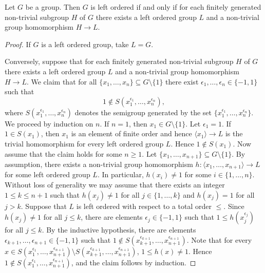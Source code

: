 
\begin{theorem}
\label{thm:BurnsHale}
Let $G$ be a group. Then $G$ is left ordered if and only if 
for each finitely generated non-trivial subgroup $H$ of $G$ there exists a left ordered group $L$ 
and a non-trivial group homomorphism $H\to L$.  
\end{theorem}

\begin{proof}
	If $G$ is a left ordered group, take $L=G$. 
	
	Conversely, suppose that for each finitely generated non-trivial subgroup $H$ of $G$ there exists a left ordered group $L$ 
and a non-trivial group homomorphism $H\to L$. We claim that for all $\{x_1,\dots,x_n\}\subseteq G\setminus\{1\}$ 
	there exist $\epsilon_1,\dots,\epsilon_n\in\{-1,1\}$ such that 
	\[
	1\not\in S(x_1^{\epsilon_1},\dots,x_n^{\epsilon_n}),
	\]
	where $S(x_1^{\epsilon_1},\dots,x_n^{\epsilon_n})$ denotes the semigroup generated by 
	the set $\{x_1^{\epsilon_1},\dots,x_n^{\epsilon_n}\}$. 
	We proceed by induction on $n$. If $n=1$, then $x_1\in G\setminus\{1\}$. Let $\epsilon_1=1$. If
	$1\in S(x_1)$, then $x_1$ is an element of finite order and hence $\langle x_1\rangle\to L$ is the trivial homomorphism for every left ordered group $L$. Hence $1\notin S(x_1)$.
    Now assume that the claim holds for some $n\geq 1$. Let $\{x_1,\dots,x_{n+1}\}\subseteq G\setminus\{1\}$. 
	By assumption, there exists a non-trivial group homomorphism 
	$h\colon\langle x_1,\dots,x_{n+1}\rangle\to L$ for some left ordered group $L$. In particular, $h(x_i)\ne 1$ for some $i\in\{1,\dots,n\}$. Without loss
	of generality we may assume that there exists an integer $1\leq k\leq n+1$ such that $h(x_j)\ne 1$ for all $j\in\{1,\dots,k\}$ and 
	$h(x_j)=1$ for all $j>k$. Suppose that $L$ is left ordered with respect to a total order $\leq$. Since $h(x_j)\ne 1$ for all $j\leq k$, there
	are elements $\epsilon_j\in\{-1,1\}$ such that $1\leq h(x_j^{\epsilon_j})$ for all $j\leq k$. By the inductive hypothesis, 
	there are elements $\epsilon_{k+1},\dots,\epsilon_{n+1}\in\{-1,1\}$ such that 
	$1\not\in S(x_{k+1}^{\epsilon_{k+1}},\dots,x_{n+1}^{\epsilon_{n+1}})$. Note that for every  $x\in S(x_1^{\epsilon_1},\dots,x_{n+1}^{\epsilon_{n+1}})\setminus S(x_{k+1}^{\epsilon_{k+1}},\dots,x_{n+1}^{\epsilon_{n+1}})$, $1\leq h(x)\neq 1$. Hence $1\notin S(x_1^{\epsilon_1},\dots ,x_{n+1}^{\epsilon_{n+1}})$, and the claim follows by induction.
	

\end{proof}
